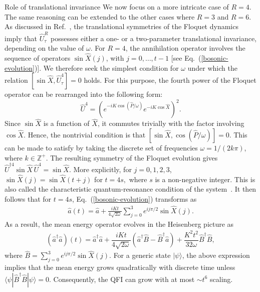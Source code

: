 \documentclass[amsmath,nobibnotes,aps,amssymb,pra, prl,aps,showpacs,superscriptaddress,twocolumn, longbibliography, reprint]{revtex4-2}
\begin{document}
\begin{section}{Role of translational invariance}
We now focus on a more intricate case of $R=4$. The same reasoning can be extended to the other cases where $R=3$ and $R=6$. As discussed in Ref.~\cite{borgonovi1995translational}, the translational symmetries of the Floquet dynamics imply that $\hat{U}_\tau^R$ possesses either a one- or a two-parameter translational invariance, depending on the value of $\omega$. For $R=4$, the annihilation operator involves the sequence of operators $\sin\hat{X}(j)$, with $j=0,\ldots,t-1$ [see Eq.~(\ref{bosonic-evolution})]. We therefore seek the simplest condition for $\omega$ under which the relation $[\sin\hat{X},\hat{U}_\tau^4]=0$ holds. For this purpose, the fourth power of the Floquet operator can be rearranged into the following form:
\begin{equation}
\hat{U}^4
=
\left(
e^{-iK\cos(\hat{P}/\omega)}
e^{-iK\cos\hat{X}}
\right)^2.
\end{equation}
Since $\sin\hat{X}$ is a function of $\hat{X}$, it commutes trivially with the factor involving $\cos\hat{X}$. Hence, the nontrivial condition is that $[\sin\hat{X},\cos(\hat{P}/\omega)]=0$. This can be made to satisfy by taking the discrete set of frequencies $\omega={1}/{(2k\pi)}$, where $k\in\mathbb{Z}^{+}$. The resulting symmetry of the Floquet evolution gives
$
\hat{U}^{\dagger 4}\sin\hat{X}\,\hat{U}^{4}
=
\sin\hat{X}.
$
More explicitly, for $j=0,1,2,3$, $\sin\hat{X}(j)=\sin\hat{X}(t+j)$ for $t=4s,$
where $s$ is a non-negative integer. This is also called the characteristic quantum-resonance condition of the system~\cite{billam2009quantum}. It then follows that for $t=4s$, Eq.~(\ref{bosonic-evolution}) transforms as
\begin{eqnarray}\label{R4bos}
\hat{a}(t)
=
\hat{a}
+
\frac{iKt}{4\sqrt{2\omega}}
\sum_{j=0}^{3}
e^{ij\pi/2}\sin\hat{X}(j).
\end{eqnarray}
As a result, the mean energy operator evolves in the Heisenberg picture as 
\begin{eqnarray}
\left(\hat{a}^{\dagger}\hat{a}\right)(t) = \hat{a}^{\dagger}\hat{a} + \dfrac{iKt}{4\sqrt{2\omega}}\left( \hat{a}^{\dagger}\hat{B}-\hat{B}^{\dagger} \hat{a} \right) + \dfrac{K^2t^2}{32\omega} \hat{B}^{\dagger}\hat{B},  
\end{eqnarray}
where $\hat{B} = \sum_{j=0}^{3}e^{ij\pi/2}\sin\hat{X}(j)$. For a generic state $|\psi\rangle$, the above expression implies that the mean energy grows quadratically with discrete time unless $\langle \psi | \hat{B}^{\dagger}\hat{B} |\psi\rangle = 0$. Consequently, the QFI can grow with at most $\sim t^6$ scaling. 




\end{section}
\end{document}
